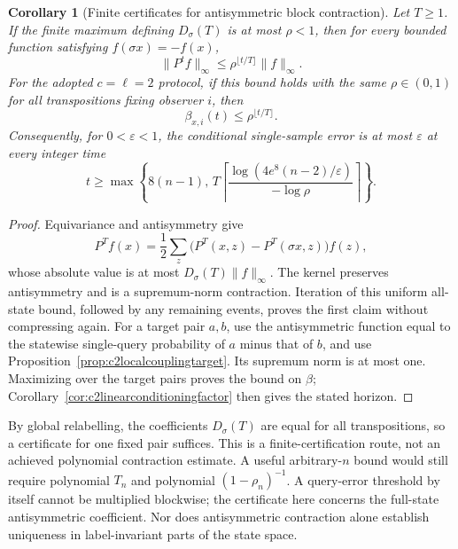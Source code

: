\documentclass[11pt]{article}
\newtheorem{corollary}[theorem]{Corollary}
\begin{document}
\begin{corollary}[Finite certificates for antisymmetric block contraction]
\label{cor:finiteantisymmetriccertificate}
Let $T\ge1$. If the finite maximum defining $D_\sigma(T)$
is at most $\rho<1$, then for every bounded function satisfying
$f(\sigma x)=-f(x)$,
\[
 \|P^t f\|_\infty
 \le \rho^{\lfloor t/T\rfloor}\|f\|_\infty.
\]
For the adopted $c=\ell=2$ protocol, if this bound holds with
the same $\rho\in(0,1)$ for all transpositions fixing observer
$i$, then
\[
 \beta_{x,i}(t)\le\rho^{\lfloor t/T\rfloor}.
\]
Consequently, for $0<\varepsilon<1$, the conditional
single-sample error is at most $\varepsilon$ at every integer time
\[
 t\ge\max\!\left\{8(n-1),\,
 T\left\lceil\frac{\log(4e^8(n-2)/\varepsilon)}{-\log\rho}
 \right\rceil\right\}.
\]
\end{corollary}
\begin{proof}
Equivariance and antisymmetry give
\[
 P^Tf(x)=\frac12\sum_z
   \bigl(P^T(x,z)-P^T(\sigma x,z)\bigr)f(z),
\]
whose absolute value is at most
$D_\sigma(T)\|f\|_\infty$. The kernel preserves
antisymmetry and is a supremum-norm contraction. Iteration
of this uniform all-state bound, followed by any remaining
events, proves the first claim without compressing again.
For a target pair $a,b$, use the antisymmetric function
equal to the statewise single-query probability of $a$
minus that of $b$, and use Proposition~\ref{prop:c2localcouplingtarget}.
Its supremum norm is at most one. Maximizing over the target
pairs proves the bound on $\beta$; Corollary~\ref{cor:c2linearconditioningfactor}
then gives the stated horizon.
\end{proof}

By global relabelling, the coefficients $D_\sigma(T)$ are
equal for all transpositions, so a certificate for one fixed
pair suffices. This is a finite-certification route, not an
achieved polynomial contraction estimate. A useful arbitrary-$n$
bound would still require polynomial $T_n$ and polynomial
$(1-\rho_n)^{-1}$. A query-error threshold by itself cannot
be multiplied blockwise; the certificate here concerns the
full-state antisymmetric coefficient. Nor does antisymmetric
contraction alone establish uniqueness in label-invariant
parts of the state space.
\end{document}

